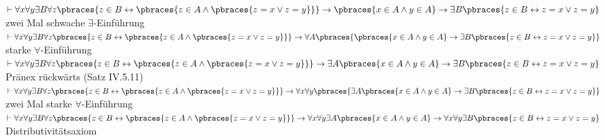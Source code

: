 \begin{solution}
\begin{algorithmic}[1]
	\State $\vdash \forall x \forall y \exists B \forall z \pbraces{z \in B \leftrightarrow \pbraces{ z \in A \land \pbraces{z = x \lor z = y}}} \rightarrow \pbraces{x \in A \land y \in A} \rightarrow \exists B \pbraces{z \in B \leftrightarrow z = x \lor z=y}$ \Comment zwei Mal schwache $\exists$-Einführung
	\State $\vdash \forall x \forall y \exists B \forall z \pbraces{z \in B \leftrightarrow \pbraces{ z \in A \land \pbraces{z = x \lor z = y}}} \rightarrow \forall A\pbraces{\pbraces{x \in A \land y \in A} \rightarrow \exists B \pbraces{z \in B \leftrightarrow z = x \lor z=y}}$ \Comment starke $\forall$-Einführung
	\State $\vdash \forall x \forall y \exists B \forall z \pbraces{z \in B \leftrightarrow \pbraces{ z \in A \land \pbraces{z = x \lor z = y}}} \rightarrow \exists A \pbraces{x \in A \land y \in A} \rightarrow \exists B \pbraces{z \in B \leftrightarrow z = x \lor z=y}$ \Comment Pränex rückwärts (Satz IV.5.11)
	\State $\vdash \forall x \forall y \exists B \forall z \pbraces{z \in B \leftrightarrow \pbraces{ z \in A \land \pbraces{z = x \lor z = y}}} \rightarrow \forall x \forall y\pbraces{\exists A \pbraces{x \in A \land y \in A} \rightarrow \exists B \pbraces{z \in B \leftrightarrow z = x \lor z=y}}$ \Comment zwei Mal starke $\forall$-Einführung
	\State $\vdash \forall x \forall y \exists B \forall z \pbraces{z \in B \leftrightarrow \pbraces{ z \in A \land \pbraces{z = x \lor z = y}}} \rightarrow \forall x \forall y \exists A \pbraces{x \in A \land y \in A} \rightarrow \forall x \forall y \exists B \pbraces{z \in B \leftrightarrow z = x \lor z=y}$ \Comment Distributivitätsaxiom
\end{algorithmic}

\end{solution}
